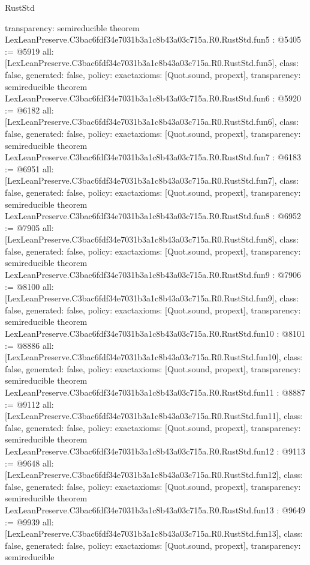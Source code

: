 \begin{lexlean}{RustStd}
\begin{coremodule}
{  transparency: semireducible
}
theorem LexLeanPreserve.C3bac6fdf34e7031b3a1c8b43a03c715a.R0.RustStd.fun5 : @5405 := @5919 {
  all: [LexLeanPreserve.C3bac6fdf34e7031b3a1c8b43a03c715a.R0.RustStd.fun5],
  class: false,
  generated: false,
  policy: exact{axioms: [Quot.sound, propext]},
  transparency: semireducible
}
theorem LexLeanPreserve.C3bac6fdf34e7031b3a1c8b43a03c715a.R0.RustStd.fun6 : @5920 := @6182 {
  all: [LexLeanPreserve.C3bac6fdf34e7031b3a1c8b43a03c715a.R0.RustStd.fun6],
  class: false,
  generated: false,
  policy: exact{axioms: [Quot.sound, propext]},
  transparency: semireducible
}
theorem LexLeanPreserve.C3bac6fdf34e7031b3a1c8b43a03c715a.R0.RustStd.fun7 : @6183 := @6951 {
  all: [LexLeanPreserve.C3bac6fdf34e7031b3a1c8b43a03c715a.R0.RustStd.fun7],
  class: false,
  generated: false,
  policy: exact{axioms: [Quot.sound, propext]},
  transparency: semireducible
}
theorem LexLeanPreserve.C3bac6fdf34e7031b3a1c8b43a03c715a.R0.RustStd.fun8 : @6952 := @7905 {
  all: [LexLeanPreserve.C3bac6fdf34e7031b3a1c8b43a03c715a.R0.RustStd.fun8],
  class: false,
  generated: false,
  policy: exact{axioms: [Quot.sound, propext]},
  transparency: semireducible
}
theorem LexLeanPreserve.C3bac6fdf34e7031b3a1c8b43a03c715a.R0.RustStd.fun9 : @7906 := @8100 {
  all: [LexLeanPreserve.C3bac6fdf34e7031b3a1c8b43a03c715a.R0.RustStd.fun9],
  class: false,
  generated: false,
  policy: exact{axioms: [Quot.sound, propext]},
  transparency: semireducible
}
theorem LexLeanPreserve.C3bac6fdf34e7031b3a1c8b43a03c715a.R0.RustStd.fun10 : @8101 := @8886 {
  all: [LexLeanPreserve.C3bac6fdf34e7031b3a1c8b43a03c715a.R0.RustStd.fun10],
  class: false,
  generated: false,
  policy: exact{axioms: [Quot.sound, propext]},
  transparency: semireducible
}
theorem LexLeanPreserve.C3bac6fdf34e7031b3a1c8b43a03c715a.R0.RustStd.fun11 : @8887 := @9112 {
  all: [LexLeanPreserve.C3bac6fdf34e7031b3a1c8b43a03c715a.R0.RustStd.fun11],
  class: false,
  generated: false,
  policy: exact{axioms: [Quot.sound, propext]},
  transparency: semireducible
}
theorem LexLeanPreserve.C3bac6fdf34e7031b3a1c8b43a03c715a.R0.RustStd.fun12 : @9113 := @9648 {
  all: [LexLeanPreserve.C3bac6fdf34e7031b3a1c8b43a03c715a.R0.RustStd.fun12],
  class: false,
  generated: false,
  policy: exact{axioms: [Quot.sound, propext]},
  transparency: semireducible
}
theorem LexLeanPreserve.C3bac6fdf34e7031b3a1c8b43a03c715a.R0.RustStd.fun13 : @9649 := @9939 {
  all: [LexLeanPreserve.C3bac6fdf34e7031b3a1c8b43a03c715a.R0.RustStd.fun13],
  class: false,
  generated: false,
  policy: exact{axioms: [Quot.sound, propext]},
  transparency: semireducible
}
\end{coremodule}
\end{lexlean}
